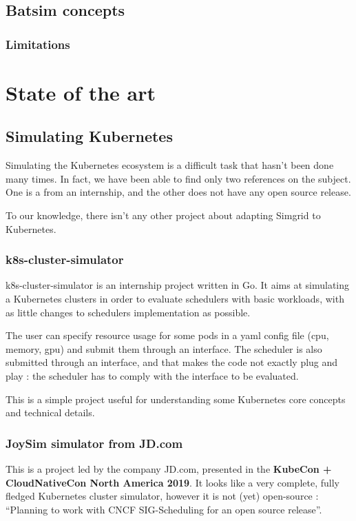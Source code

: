 \documentclass[12pt]{report}
\begin{document}
\section{Batsim concepts}

\subsection{Limitations}


\chapter{State of the art}

\section{Simulating Kubernetes}

Simulating the Kubernetes ecosystem is a difficult task that hasn't been done
many times. In fact, we have been able to find only two references on the
subject. One is a from an internship, and the other does not have any open
source release.

To our knowledge, there isn't any other project about adapting Simgrid to
Kubernetes.

\subsection{k8s-cluster-simulator}

k8s-cluster-simulator\cite{kubesim} is an internship project written in Go. It
aims at simulating a Kubernetes clusters in order to evaluate schedulers with
basic workloads, with as little changes to schedulers implementation as
possible.

The user can specify resource usage for some pods in a yaml config file (cpu,
memory, gpu) and submit them through an interface. The scheduler is also
submitted through an interface, and that makes the code not exactly plug and
play : the scheduler has to comply with the interface to be evaluated.

This is a simple project useful for understanding some Kubernetes core concepts
and technical details.

\subsection{JoySim simulator from JD.com}

This is a project led by the company JD.com, presented in the \textbf{KubeCon +
	CloudNativeCon North America 2019}\cite{joysim}. It looks like a very
complete, fully fledged Kubernetes cluster simulator, however it is not (yet)
open-source : ``Planning to work with CNCF SIG-Scheduling for an open source
release''.
\end{document}
